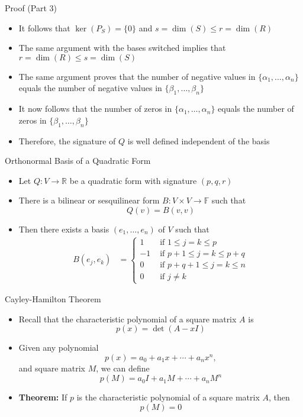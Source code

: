 \documentclass[usenames,dvipsnames,10pt]{beamer}
\newcommand\F{\mathbb{F}}
\newcommand{\R}{\mathbb{R}}
\begin{document}
\begin{frame}
  {Proof (Part 3)}

  \begin{itemize}
  \item It follows that $\ker(P_S) = \{0\}$ and $s = \dim(S) \le r = \dim(R)$
  \item The same argument with the bases switched implies that $r = \dim(R)\le s = \dim(S)$
  \item The same argument proves that the number of negative values in $\{ \alpha_1, \dots, \alpha_n\}$ equals the number of negative values in $\{\beta_1, \dots, \beta_n\}$
  \item It now follows that the number of zeros in $\{ \alpha_1, \dots, \alpha_n\}$ equals the number of zeros in $\{\beta_1, \dots, \beta_n\}$
  \item Therefore, the signature of $Q$ is well defined independent of the basis
  \end{itemize}
\end{frame}

\begin{frame}
  {Orthonormal Basis of a Quadratic Form}

  \begin{itemize}
  \item Let $Q: V \rightarrow \R$ be a quadratic form with signature $(p,q,r)$
  \item There is a bilinear or sesquilinear form $B: V\times V\rightarrow \F$ such that
    \[ Q(v) = B(v,v) \]
  \item Then there exists a basis $(e_1, \dots, e_n)$ of $V$ such that
    \begin{align*}
      B(e_j,e_k)
      &= \begin{cases}
           1 &\text{ if }1 \le j = k \le p\\
           -1 &\text{ if }p+1 \le j = k \le p+q\\
           0 &\text{ if }p+q+1 \le j = k \le n\\
           0 &\text{ if }j \ne k
         \end{cases}
    \end{align*}
  \end{itemize}
\end{frame}

\begin{frame}
  {Cayley-Hamilton Theorem}

  \begin{itemize}
  \item Recall that the characteristic polynomial of a square matrix $A$ is
    \[
      p(x) = \det(A-xI)
    \]
  \item Given any polynomial
    \[ p(x) = a_0 + a_1x + \cdots + a_nx^n, \]
    and square matrix $M$, we can define
    \[
      p(M) = a_0I + a_1M + \cdots + a_nM^n
    \]
  \item {\bf Theorem:} If $p$ is the characteristic polynomial of a square matrix $A$, then
    \[ p(M) = 0 \]
  \end{itemize}
\end{frame}
\end{document}

